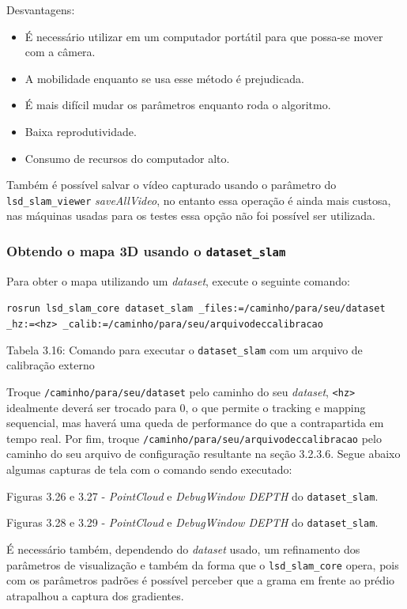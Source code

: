 Desvantagens:

\begin{itemize}
	\item{É necessário utilizar em um computador portátil para que possa-se mover com a câmera.}
	\item{A mobilidade enquanto se usa esse método é prejudicada.}
	\item{É mais difícil mudar os parâmetros enquanto roda o algoritmo.}
	\item{Baixa reprodutividade.}
	\item{Consumo de recursos do computador alto.}
\end{itemize}	

Também é possível salvar o vídeo capturado usando o parâmetro do \texttt{lsd\_slam\_viewer} \textit{saveAllVideo}, no entanto essa operação é ainda mais custosa, nas máquinas usadas para os testes essa opção não foi possível ser utilizada.

\subsubsection{Obtendo o mapa 3D usando o \texttt{dataset\_slam}}

Para obter o mapa utilizando um \textit{dataset}, execute o seguinte comando:

\texttt{rosrun lsd\_slam\_core dataset\_slam \_files:=/caminho/para/seu/dataset \_hz:=<hz> \_calib:=/caminho/para/seu/arquivodeccalibracao}

Tabela 3.16: Comando para executar o \texttt{dataset\_slam} com um arquivo de calibração externo

Troque \texttt{/caminho/para/seu/dataset} pelo caminho do seu \textit{dataset}, \texttt{<hz>} idealmente deverá ser trocado para 0, o que permite o tracking e mapping sequencial, mas haverá uma queda de performance do que a contrapartida em tempo real. Por fim, troque \texttt{/caminho/para/seu/arquivodeccalibracao} pelo caminho do seu arquivo de configuração resultante na seção 3.2.3.6. Segue abaixo algumas capturas de tela com o comando sendo executado:

Figuras 3.26 e 3.27 - \textit{PointCloud} e \textit{DebugWindow DEPTH} do \texttt{dataset\_slam}.

Figuras 3.28 e 3.29 - \textit{PointCloud} e \textit{DebugWindow DEPTH} do \texttt{dataset\_slam}.

É necessário também, dependendo do \textit{dataset} usado, um refinamento dos parâmetros de visualização e também da forma que o \texttt{lsd\_slam\_core} opera, pois com os parâmetros padrões é possível perceber que a grama em frente ao prédio atrapalhou a captura dos gradientes.

